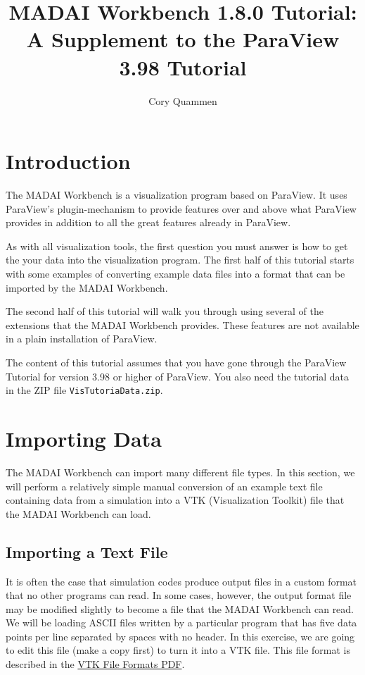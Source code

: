 \documentclass[12pt]{article}
\title{MADAI Workbench 1.8.0 Tutorial: \\A Supplement to the ParaView 3.98 Tutorial}
\author{Cory Quammen}
\date{} %
\newcommand{\file}[1]{\texttt{#1}}
\begin{document}
\maketitle
\tableofcontents

\section{Introduction}

The MADAI Workbench is a visualization program based on ParaView. It uses ParaView's plugin-mechanism to provide features over and above what ParaView provides in addition to all the great features already in ParaView.

As with all visualization tools, the first question you must answer is how to get the your data into the visualization program. The first half of this tutorial starts with some examples of converting example data files into a format that can be imported by the MADAI Workbench. 

The second half of this tutorial will walk you through using several of the extensions that the MADAI Workbench provides. These features are not available in a plain installation of ParaView.

The content of this tutorial assumes that you have gone through the ParaView Tutorial for version 3.98 or higher of ParaView. You also need the tutorial data in the ZIP file \file{VisTutoriaData.zip}.

\section{Importing Data}

The MADAI Workbench can import many different file types. In this section, we will perform a relatively simple manual conversion of an example text file containing data from a simulation into a VTK (Visualization Toolkit) file that the MADAI Workbench can load.

\subsection{Importing a Text File}

It is often the case that simulation codes produce output files in a custom format that no other programs can read. In some cases, however, the output format file may be modified slightly to become a file that the MADAI Workbench can read. We will be loading ASCII files written by a particular program that has five data points per line separated by spaces with no header. In this exercise, we are going to edit this file (make a copy first) to turn it into a VTK file. This file format is described in the \href{http://www.vtk.org/VTK/img/file-formats.pdf}{VTK File Formats PDF}.
\end{document}
